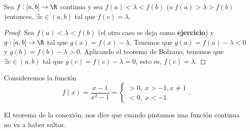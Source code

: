 \begin{fcolorary}
	\normalfont Sea $\displaystyle f : [a,b] \to \R $ continua y sea $\displaystyle f\left(a\right) < \lambda < f\left(b\right) $ (o $\displaystyle f\left(a\right) > \lambda > f\left(b\right) $)entonces, $\displaystyle \exists c \in \left(a,b\right) $ tal que $\displaystyle f\left(c\right) = \lambda  $.
\end{fcolorary}
\begin{proof}
	Sea $\displaystyle f\left(a\right) < \lambda < f\left(b\right) $ (el otro caso se deja como \textbf{ejercicio}) y $\displaystyle g : [a,b] \to \R  $ tal que $\displaystyle g\left(x\right) = f\left(x\right)- \lambda  $. Tenemos que $\displaystyle g\left(a\right) = f\left(a\right)- \lambda < 0 $ y $\displaystyle g\left(b\right) = f\left(b\right) - \lambda > 0 $. Aplicando el teorema de Bolzano, tenemos que $\displaystyle \exists c\in \left(a,b\right) $ tal que $\displaystyle g\left(c\right) = f\left(c\right) - \lambda = 0 $, esto es, $\displaystyle f\left(c\right) = \lambda  $.
\end{proof}
\begin{eg}
\normalfont Consideremos la función 
\[f\left(x\right) = \frac{x - 1}{x^{2}-1} = 
\begin{cases}
> 0, \; x > - 1, x \neq 1 \\
< 0, \; x < - 1
\end{cases}
.\]
\end{eg}
\begin{observation}
\normalfont El teorema de la conexión, nos dice que cuando pintamos una función continua no va a haber saltos.
\end{observation}
